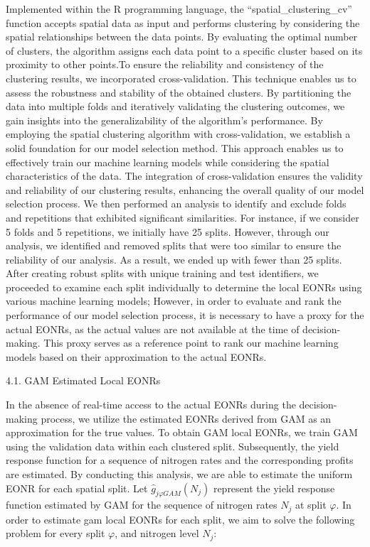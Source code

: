 \documentclass[
  12pt,
]{article}
\begin{document}
Implemented within the R programming language, the ``spatial\_clustering\_cv'' function accepts spatial data as input and performs clustering by considering the spatial relationships between the data points. By evaluating the optimal number of clusters, the algorithm assigns each data point to a specific cluster based on its proximity to other points.To ensure the reliability and consistency of the clustering results, we incorporated cross-validation. This technique enables us to assess the robustness and stability of the obtained clusters. By partitioning the data into multiple folds and iteratively validating the clustering outcomes, we gain insights into the generalizability of the algorithm's performance. By employing the spatial clustering algorithm with cross-validation, we establish a solid foundation for our model selection method. This approach enables us to effectively train our machine learning models while considering the spatial characteristics of the data. The integration of cross-validation ensures the validity and reliability of our clustering results, enhancing the overall quality of our model selection process. We then performed an analysis to identify and exclude folds and repetitions that exhibited significant similarities. For instance, if we consider 5 folds and 5 repetitions, we initially have 25 splits. However, through our analysis, we identified and removed splits that were too similar to ensure the reliability of our analysis. As a result, we ended up with fewer than 25 splits. After creating robust splits with unique training and test identifiers, we proceeded to examine each split individually to determine the local EONRs using various machine learning models; However, in order to evaluate and rank the performance of our model selection process, it is necessary to have a proxy for the actual EONRs, as the actual values are not available at the time of decision-making. This proxy serves as a reference point to rank our machine learning models based on their approximation to the actual EONRs.

4.1. GAM Estimated Local EONRs

In the absence of real-time access to the actual EONRs during the decision-making process, we utilize the estimated EONRs derived from GAM as an approximation for the true values. To obtain GAM local EONRs, we train GAM using the validation data within each clustered split. Subsequently, the yield response function for a sequence of nitrogen rates and the corresponding profits are estimated. By conducting this analysis, we are able to estimate the uniform EONR for each spatial split.
Let \({\hat{g}}_{j\varphi GAM}(N_j)\) represent the yield response function estimated by GAM for the sequence of nitrogen rates \(N_j\) at split \(\varphi\). In order to estimate gam local EONRs for each split, we aim to solve the following problem for every split \(\varphi\), and nitrogen level \(N_j\):
\end{document}
